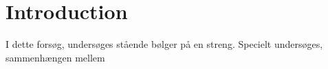 \section{Introduction}
I dette forsøg, undersøges stående bølger på en streng. Specielt undersøges, sammenhængen mellem 
